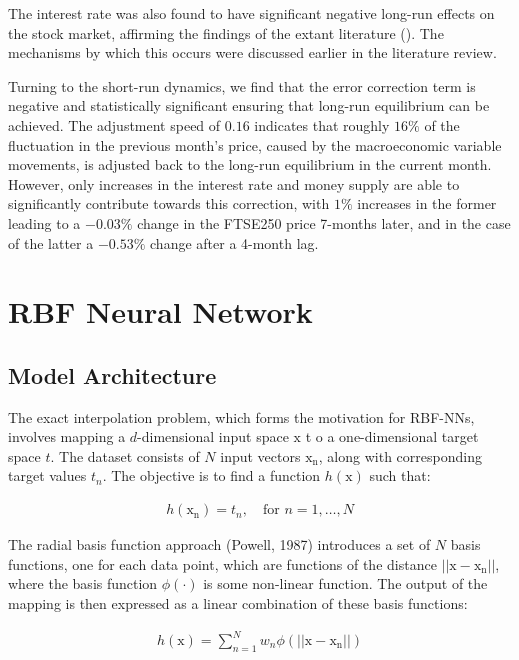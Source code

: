 \documentclass[11pt,a4paper]{article}
\begin{document}
The interest rate was also found to have significant negative long-run effects on the 
stock market, affirming the findings of the extant literature ().
The mechanisms by which this occurs were discussed earlier in the literature review.


Turning to the short-run dynamics, we find that the error correction term 
is negative and statistically significant ensuring that long-run equilibrium 
can be achieved. The adjustment speed of $0.16$ indicates that 
roughly $16\%$ of the fluctuation in the previous month's price, caused by the 
macroeconomic variable movements, is adjusted back to the long-run equilibrium in the current month.
However, only increases in the interest rate and money supply are able to 
significantly contribute towards this correction, with $1\%$ increases in the former 
leading to a $-0.03\%$ change in the FTSE250 price 7-months later, and in the case of the latter
a $-0.53\%$ change after a 4-month lag. 

\section{RBF Neural Network}

\subsection{Model Architecture}

The exact interpolation problem, which forms the motivation for RBF-NNs, 
involves mapping a $d$-dimensional input space $\boldsymbol{\mathrm{x}}$ t
o a one-dimensional target space $t$. The dataset consists of $N$ input
 vectors $\boldsymbol{\mathrm{x_n}}$, along with corresponding target 
 values $t_n$. The objective is to find a function
  $h(\boldsymbol{\mathrm{x}})$ such that:


\begin{align}
  h(\boldsymbol{\mathrm{x_n}}) = t_n, \quad \text{for } n = 1, \ldots, N
\end{align}

The radial basis function approach (Powell, 1987) 
introduces a set of $N$ basis functions, one for each 
data point, which are functions of the distance
$||\boldsymbol{\mathrm{x}} - \boldsymbol{\mathrm{x_n}}||$, where
the basis function $\phi(\cdot)$ is some non-linear function. The output of the mapping is then expressed as a linear combination of these basis functions:

\begin{align}
    h(\boldsymbol{\mathrm{x}}) = \sum_{n=1}^{N} w_n \phi(||\boldsymbol{\mathrm{x}} - \boldsymbol{\mathrm{x_n}}||)
\end{align}
\end{document}
